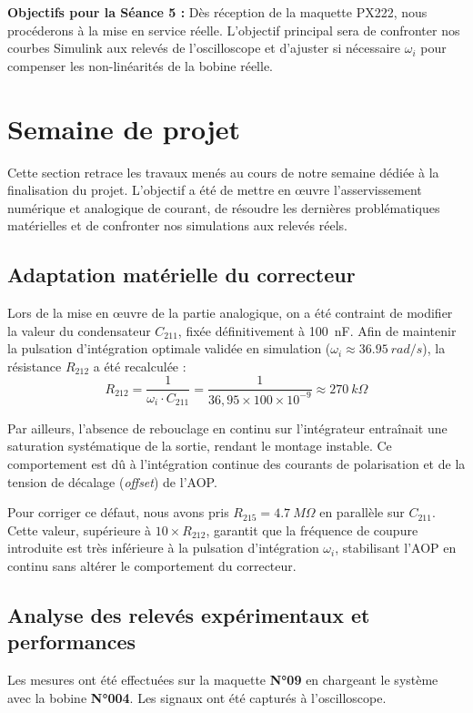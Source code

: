 \documentclass[11pt]{report}
\begin{document}
\textbf{Objectifs pour la Séance 5 :} Dès réception de la maquette PX222, nous procéderons à la mise en service réelle. L'objectif principal sera de confronter nos courbes Simulink aux relevés de l'oscilloscope et d'ajuster si nécessaire $\omega_{i}$ pour compenser les non-linéarités de la bobine réelle.

\chapter{Semaine de projet}
Cette section retrace les travaux  menés au cours de notre semaine dédiée à la finalisation du projet. L'objectif a été de mettre en œuvre l'asservissement numérique et analogique de courant, de résoudre les dernières problématiques matérielles et de confronter nos simulations aux relevés réels.

\section{Adaptation matérielle du correcteur}
Lors de la mise en œuvre de la partie analogique, on a été contraint de modifier la valeur du condensateur $C_{211}$, fixée définitivement à \qty{100}{nF}. Afin de maintenir la pulsation d'intégration optimale validée en simulation ($\omega_i \approx \qty{36,95}{rad/s}$), la résistance $R_{212}$ a été recalculée :
\begin{equation}
R_{212} = \frac{1}{\omega_i \cdot C_{211}} = \frac{1}{36,95 \times 100 \times 10^{-9}} \approx \qty{270}{k\Omega}
\end{equation}

Par ailleurs, l'absence de rebouclage en continu sur l'intégrateur entraînait une saturation systématique de la sortie, rendant le montage instable. Ce comportement est dû à l'intégration continue des courants de polarisation et de la tension de décalage (\textit{offset}) de l'AOP. 

Pour corriger ce défaut, nous avons pris $R_{215} = \qty{4,7}{M\Omega}$ en parallèle sur $C_{211}$. Cette valeur, supérieure à $10 \times R_{212}$, garantit que la fréquence de coupure introduite est très inférieure à la pulsation d'intégration $\omega_i$, stabilisant l'AOP en continu sans altérer le comportement du correcteur.

\section{Analyse des relevés expérimentaux et performances}
Les mesures ont été effectuées sur la maquette \textbf{N°09} en chargeant le système avec la bobine \textbf{N°004}. Les signaux ont été capturés à l'oscilloscope.
\end{document}
